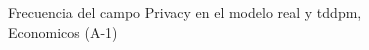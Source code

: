 \begin{figure}[H]
    \centering
    
    \caption{Frecuencia del campo Privacy en el modelo real y tddpm, Economicos (A-1)}
    \label{frecuency-Privacy-tddpm_mlp}
\end{figure}